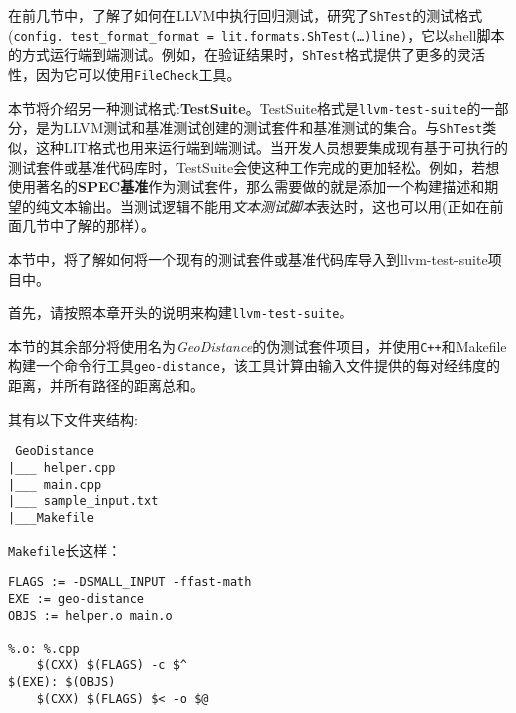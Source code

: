 
在前几节中，了解了如何在LLVM中执行回归测试，研究了\texttt{ShTest}的测试格式(\texttt{config.
test\_format\_format = lit.formats.ShTest(…)line)}，它以shell脚本的方式运行端到端测试。例如，在验证结果时，\texttt{ShTest}格式提供了更多的灵活性，因为它可以使用\texttt{FileCheck}工具。

本节将介绍另一种测试格式:\textbf{TestSuite}。TestSuite格式是\texttt{llvm-test-suite}的一部分，是为LLVM测试和基准测试创建的测试套件和基准测试的集合。与\texttt{ShTest}类似，这种LIT格式也用来运行端到端测试。当开发人员想要集成现有基于可执行的测试套件或基准代码库时，TestSuite会使这种工作完成的更加轻松。例如，若想使用著名的\textbf{SPEC基准}作为测试套件，那么需要做的就是添加一个构建描述和期望的纯文本输出。当测试逻辑不能用\textit{文本测试脚本}表达时，这也可以用(正如在前面几节中了解的那样）。

本节中，将了解如何将一个现有的测试套件或基准代码库导入到llvm-test-suite项目中。


首先，请按照本章开头的说明来构建\texttt{llvm-test-suite。}

本节的其余部分将使用名为\textit{GeoDistance}的伪测试套件项目，并使用\texttt{C++}和Makefile构建一个命令行工具\texttt{geo-distance}，该工具计算由输入文件提供的每对经纬度的距离，并所有路径的距离总和。

其有以下文件夹结构:

\begin{tcolorbox}[colback=white,colframe=black]
\tt
GeoDistance \\
\hspace*{0.5cm}|\_\_\_ helper.cpp \\
\hspace*{0.5cm}|\_\_\_ main.cpp \\
\hspace*{0.5cm}|\_\_\_ sample\_input.txt \\
\hspace*{0.5cm}|\_\_\_Makefile 
\end{tcolorbox}

\texttt{Makefile}长这样：

\begin{lstlisting}[style=styleJavaScript]
FLAGS := -DSMALL_INPUT -ffast-math
EXE := geo-distance
OBJS := helper.o main.o

%.o: %.cpp
	$(CXX) $(FLAGS) -c $^
$(EXE): $(OBJS)
	$(CXX) $(FLAGS) $< -o $@
\end{lstlisting}

